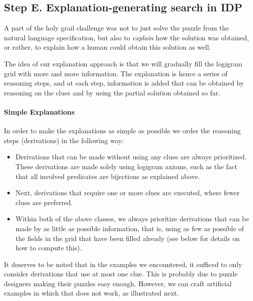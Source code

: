 \subsection{Step E. Explanation-generating search in IDP} 
A part of the holy grail challenge was not to just solve the puzzle from the natural language specification, but also to \emph{explain} how the solution was obtained, or rather, to explain how a human could obtain this solution as well. 

The idea of our explanation approach is that we will gradually fill the logigram grid with more and more information. The explanation is hence a series of reasoning steps, and at each step, information is added that can be obtained by reasoning on the clues and by using the partial solution obtained so far. 

\paragraph{Simple Explanations}
In order to make the explanations as simple as possible we order the reasoning steps (derivations) in the following way: 
\begin{itemize}
 \item Derivations that can be made without using any clues are always prioritized. These derivations are made solely using logigram axioms, such as the fact that all involved predicates are bijections as explained above. %
 \item Next, derivations that require one or more clues are executed, where fewer clues are preferred. 
 \item Within both of the above classes, we always prioritize derivations that can be made by as little as possible information, that is, using as few as possible of the fields in the grid that have been filled already (see below for details on how to compute this).
\end{itemize}
It deserves to be noted that in the examples we encountered, it sufficed to only consider derivations that use at most one clue. This is probably due to puzzle designers making their puzzles easy enough. However, we can craft artificial examples in which that does not work, as illustrated next. 
